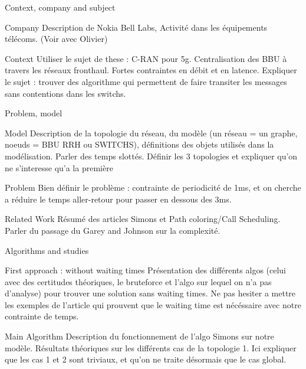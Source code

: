 \documentclass[a4paper,10pt,openany]{book}
\begin{document}
\begin{chapter}{Context, company and subject}
\begin{section}{Company}
 Description de Nokia Bell Labs, Activité dans les équipements télécoms. (Voir avec Olivier)
\end{section}
\begin{section}{Context}
 Utiliser le sujet de these : C-RAN pour 5g. Centralisation des BBU à travers les réseaux fronthaul.
 Fortes contraintes en débit et en latence. Expliquer le sujet : trouver des algorithme qui permettent de faire 
 transiter les messages sans contentions dans les switchs.
\end{section}

\end{chapter}

\begin{chapter}{Problem, model}
 \begin{section}{Model}
  Description de la topologie du réseau, du modèle (un réseau = un graphe, noeuds = BBU RRH ou SWITCHS), 
  définitions des objets utilisés dans la modélisation. Parler des temps slottés.
  Définir les 3 topologies et expliquer qu'on ne s'interesse qu'a la première

 \end{section}
 \begin{section}{Problem}
   Bien définir le problème :  contrainte de periodicité de 1ms, et on cherche a réduire le temps aller-retour pour passer
  en dessous des 3ms. 
 \end{section}
 \begin{section}{Related Work}
Résumé des articles Simons et Path coloring/Call Scheduling.
Parler du passage du Garey and Johnson sur la complexité.
 \end{section}


\end{chapter}

\begin{chapter}{Algorithms and studies }


\begin{section}{First approach : without waiting times}
 Présentation des différents algos (celui avec des certitudes théoriques, le bruteforce et l'algo sur lequel on n'a pas d'analyse) pour trouver 
 une solution sans waiting times. Ne pas hesiter a mettre les exemples de l'article qui prouvent que le waiting time est nécéssaire avec notre contrainte de temps.
 \end{section}

\begin{section}{Main Algorithm}
Description du fonctionnement de l'algo Simons sur notre modèle. 
 Résultats théoriques sur les différents cas de la topologie 1. Ici expliquer que les cas 1 et 2 sont triviaux, et qu'on ne traite désormais que le 
 cas global.
\end{section}

\end{chapter}
\end{document}
